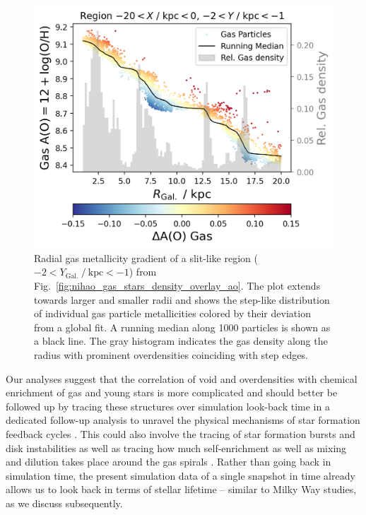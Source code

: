 \documentclass[twocolumn,apj,numberedappendix,appendixfloats,twocolappendix]{openjournal}
\begin{document}
\begin{CJK*}{UTF8}{gbsn}
\begin{figure}
    \centering
    \includegraphics[width=\columnwidth]{figures/region_r_ao_gas_density.png}
    \caption{Radial gas metallicity gradient of a slit-like region ($-2 < Y_\mathrm{Gal.}~/~\mathrm{kpc} < -1$) from Fig.~\ref{fig:nihao_gas_stars_density_overlay_ao}. The plot extends towards larger and smaller radii and shows the step-like distribution of individual gas particle metallicities colored by their deviation from a global fit. A running median along 1000 particles is shown as a black line. The gray histogram indicates the gas density along the radius with prominent overdensities coinciding with step edges.}
    \label{fig:region_r_ao_gas_density}
\end{figure}

Our analyses suggest that the correlation of void and overdensities with chemical enrichment of gas and young stars is more complicated and should better be followed up by tracing these structures over simulation look-back time in a dedicated follow-up analysis to unravel the physical mechanisms of star formation feedback cycles . This could also involve the tracing of star formation bursts and disk instabilities \citep{Sanchez2014, SanchezBlazquez2014, Ho2015} as well as tracing how much self-enrichment as well as mixing and dilution takes place around the gas spirals \citep{Ho2017c}. Rather than going back in simulation time, the present simulation data of a single snapshot in time already allows us to look back in terms of stellar lifetime -- similar to Milky Way studies, as we discuss subsequently.


\end{CJK*}
\end{document}

